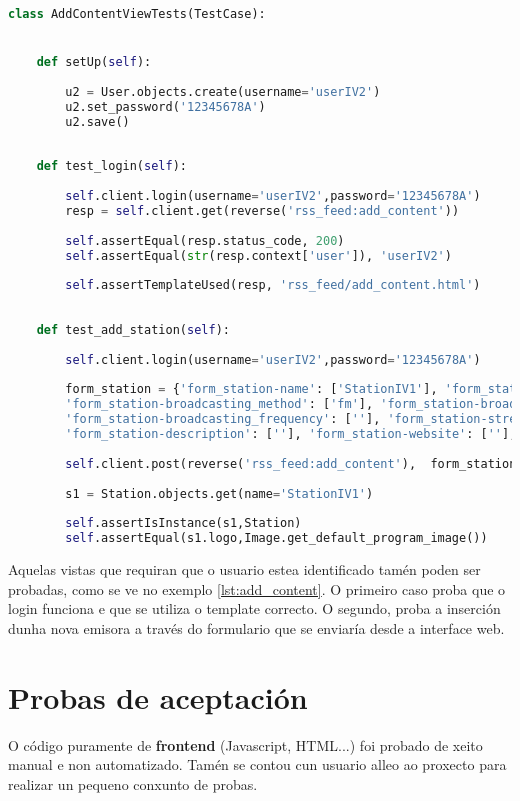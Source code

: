 \begin{lstlisting}[language=Python, caption=Fragmento das probas da vista add\_content, label=lst:add_content]
class AddContentViewTests(TestCase):


	def setUp(self):
	
		u2 = User.objects.create(username='userIV2')
		u2.set_password('12345678A')
		u2.save()
	
	
	def test_login(self):
	
		self.client.login(username='userIV2',password='12345678A')
		resp = self.client.get(reverse('rss_feed:add_content'))
		
		self.assertEqual(resp.status_code, 200)
		self.assertEqual(str(resp.context['user']), 'userIV2')
		
		self.assertTemplateUsed(resp, 'rss_feed/add_content.html')
	
	
	def test_add_station(self):
	
		self.client.login(username='userIV2',password='12345678A')
		
		form_station = {'form_station-name': ['StationIV1'], 'form_station-logo': [''], 'form_station-profile_img': [''], 
		'form_station-broadcasting_method': ['fm'], 'form_station-broadcasting_area': [''], 
		'form_station-broadcasting_frequency': [''], 'form_station-streaming_link': [''], 
		'form_station-description': [''], 'form_station-website': [''], 'form_station-location': ['']}
		
		self.client.post(reverse('rss_feed:add_content'),  form_station)
		
		s1 = Station.objects.get(name='StationIV1')
		
		self.assertIsInstance(s1,Station)
		self.assertEqual(s1.logo,Image.get_default_program_image())
\end{lstlisting}


Aquelas vistas que requiran que o usuario estea identificado tamén poden ser probadas, como se ve no exemplo \ref{lst:add_content}. O primeiro caso proba que o login funciona e que se utiliza o template correcto. O segundo, proba a inserción dunha nova emisora a través do formulario que se enviaría desde a interface web.


\section{Probas de aceptación}

O código puramente de \textbf{frontend} (Javascript, HTML...) foi probado de xeito manual e non automatizado. Tamén se contou cun usuario alleo ao proxecto para realizar un pequeno conxunto de probas.
